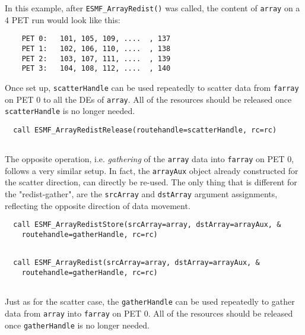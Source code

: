 
   In this example, after {\tt ESMF\_ArrayRedist()} was called, the content
   of {\tt array} on a 4 PET run would look like this:
   \begin{verbatim}
    PET 0:   101, 105, 109, ....  , 137
    PET 1:   102, 106, 110, ....  , 138
    PET 2:   103, 107, 111, ....  , 139
    PET 3:   104, 108, 112, ....  , 140
   \end{verbatim}
  
   Once set up, {\tt scatterHandle} can be used repeatedly to scatter data
   from {\tt farray} on PET 0 to all the DEs of {\tt array}. All of the
   resources should be released once {\tt scatterHandle} is no longer needed. 

 \begin{verbatim}
  call ESMF_ArrayRedistRelease(routehandle=scatterHandle, rc=rc)
 
\end{verbatim}
 

   The opposite operation, i.e. {\em gathering} of the {\tt array} data
   into {\tt farray} on PET 0, follows a very similar setup. In fact, the
   {\tt arrayAux} object already constructed for the scatter direction, can
   directly be re-used. The only thing that is different for the "redist-gather",
   are the {\tt srcArray} and {\tt dstArray} argument assignments, reflecting
   the opposite direction of data movement. 

 \begin{verbatim}
  call ESMF_ArrayRedistStore(srcArray=array, dstArray=arrayAux, &
    routehandle=gatherHandle, rc=rc)
 
\end{verbatim}
 

 \begin{verbatim}
  call ESMF_ArrayRedist(srcArray=array, dstArray=arrayAux, &
    routehandle=gatherHandle, rc=rc)
 
\end{verbatim}
 

   Just as for the scatter case, the {\tt gatherHandle} can be used repeatedly
   to gather data from {\tt array} into {\tt farray} on PET 0. All of the
   resources should be released once {\tt gatherHandle} is no longer needed. 

